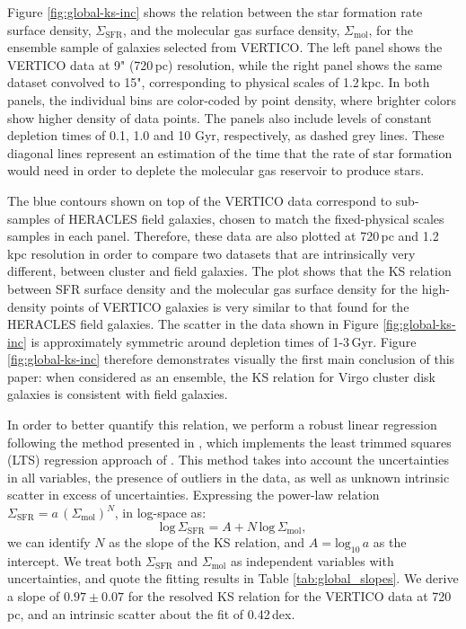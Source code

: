 \documentclass[longauth]{aa}
\begin{document}
Figure \ref{fig:global-ks-inc} shows the relation between the star formation rate surface density, $\Sigma_\textrm{SFR}$, and the molecular gas surface density, $\Sigma_\textrm{mol}$, for the ensemble sample of galaxies selected from VERTICO. The left panel shows the VERTICO data at 9" (720\,pc) resolution, while the right panel shows the same dataset convolved to 15", corresponding to physical scales of 1.2\,kpc. In both panels, the individual bins are color-coded by point density, where brighter colors show higher density of data points. The panels also include levels of constant depletion times of 0.1, 1.0 and 10 Gyr, respectively, as dashed grey lines. These diagonal lines represent an estimation of the time that the rate of star formation would need in order to deplete the molecular gas reservoir to produce stars.

The blue contours shown on top of the VERTICO data correspond to sub-samples of HERACLES field galaxies, chosen to match the fixed-physical scales samples in each panel. Therefore, these data are also plotted at 720\,pc and 1.2\,kpc resolution in order to compare two datasets that are intrinsically very different, between cluster and field galaxies. The plot shows that the KS relation between SFR surface density and the molecular gas surface density for the high-density points of VERTICO galaxies is very similar to that found for the HERACLES field galaxies. The scatter in the data shown in Figure \ref{fig:global-ks-inc} is approximately symmetric around depletion times of 1-3\,Gyr. Figure \ref{fig:global-ks-inc} therefore demonstrates visually the first main conclusion of this paper: when considered as an ensemble, the KS relation for Virgo cluster disk galaxies is consistent with field galaxies.

In order to better quantify this relation, we perform a robust linear regression following the method presented in \citet{Cappellari2013}, which implements the least trimmed squares (LTS) regression approach of \citet{Rousseeuw1984}. This method takes into account the uncertainties in all variables, the presence of outliers in the data, as well as unknown intrinsic scatter in excess of uncertainties. Expressing the power-law relation $\Sigma_\textrm{SFR} = a\,(\Sigma_\textrm{mol})^N$, in log-space as:
\begin{equation}
    \textrm{log}\,\Sigma_\textrm{SFR} = A + N\,\textrm{log}\,\Sigma_\textrm{mol},
\end{equation}
we can identify $N$ as the slope of the KS relation, and $A=\textrm{log}_{10}\,a$ as the intercept. We treat both $\Sigma_\textrm{SFR}$ and $\Sigma_\textrm{mol}$ as independent variables with uncertainties, and quote the fitting results in Table \ref{tab:global_slopes}. We derive a slope of $0.97 \pm 0.07$ for the resolved KS relation for the VERTICO data at 720\,pc, and an intrinsic scatter about the fit of 0.42\,dex.
\end{document}

